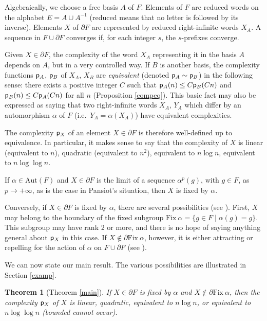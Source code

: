 \documentclass[11pt]{amsart}
\newtheorem{thm}{Theorem}[section]
\theoremstyle{remark}
\newcommand{\m} {^{-1}}
\newcommand{\Fix}{{\mathrm{Fix}}}
\newcommand{\Aut} {{\mathrm{Aut}}}
\newcommand{\cp}{{\sf  p}}
\newcommand{\bo}{\partial}
\begin{document}
Algebraically, we choose a free basis $A$ of $F$.   Elements of $F$ are reduced  words on the alphabet $E=A\cup A\m$   (reduced means that no letter is followed by its inverse). Elements $X$ of $\bo F$ are represented by reduced right-infinite  words $X_A$. A sequence   in $F\cup\bo F$ converges if, for each integer $s$, the $s$-prefixes converge.
 
   Given $X\in\partial F$, the complexity of the word $X_A$ representing it in the basis $A$ depends on $A$, but in a very controlled way. If $B$ is another basis,   the complexity functions    $\cp_A$, $\cp_B$ of $X_A$, $X_B$ are \emph{equivalent} (denoted $\cp_A\sim \cp_B$)  in the following sense: there exists  a positive integer $C $ such that $\cp_A(n)\le C\cp_B(Cn)$ and  $\cp_B(n)\le C\cp_A(Cn)$ for all $n$ (Proposition   \ref{compeq}). This basic fact may also be expressed as saying that two right-infinite words $X_A$, $Y_A$ which differ by an automorphism $\alpha$ of $F$ (i.e.\ $Y_A=\alpha(X_A)$) have equivalent complexities.
 
  The complexity $\cp_X$ of an element $X\in\bo  F$ is therefore well-defined up to equivalence.   In particular, it makes sense to say that the complexity of $X$ is linear (equivalent to $n$), quadratic (equivalent to $n^2$), equivalent to $n\log n$, equivalent to $n\log \log n$.
  

 
   If $\alpha\in\Aut(F)$ and $X\in\bo F$ is the limit of a sequence $\alpha^p(g)$, with $g\in F$, as $p\to+\infty$, as is the case in Pansiot's situation, then $X$ is fixed by $\alpha$.

 Conversely, if $X\in\bo F$ is fixed by $\alpha$, there are several possibilities (see \cite{GJLL}).  First, $X$ may belong to the boundary of the fixed subgroup $\Fix\ \alpha=\{g\in F\mid \alpha(g)=g\}$. This subgroup may have rank 2 or more, and there is no hope of saying anything general about $\cp_X$ in this case. If $X\notin\bo\Fix\ \alpha$, however, it is either attracting or repelling   for the action of $\alpha$ on $F\cup \bo F$ (see \cite{GJLL}). 
  
 We can now state our main result. The various possibilities are illustrated in Section \ref{examp}.
  
 
 \begin{thm}[Theorem \ref{main}] \label{mainintro2}
 If $X\in\bo F$ is fixed by $\alpha$ and $X\notin  \bo\Fix\ \alpha$,
 then the  complexity $\cp_X$ of $X$ is   linear, quadratic, equivalent to $n\log n$, or equivalent to $n\log \log n$ (bounded cannot occur).
\end{thm}
\end{document}
